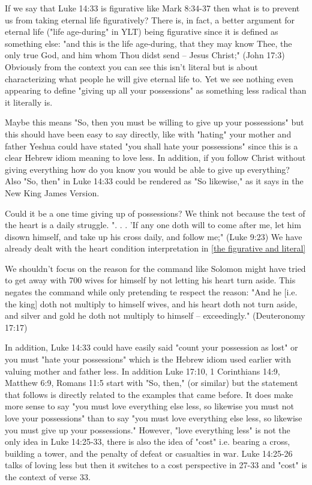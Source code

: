 \documentclass[11pt]{article}
\begin{document}
If we say that Luke 14:33 is figurative like Mark 8:34-37 then what is to prevent us from taking eternal life figuratively? There is, in fact, a better argument for eternal life ("life age-during" in YLT) being figurative since it is defined as something else: 
"and this is the life age-during, that they may know Thee, the only true God, and him whom Thou didst send -- Jesus Christ;" (John 17:3) Obviously from the context you can see this isn't literal but is about characterizing what people he will give eternal life to. Yet we see nothing even appearing to define "giving up all your possessions" as something less radical than it literally is. 

Maybe this means "So, then you must be willing to give up your possessions" but this should have been easy to say directly, like with "hating" your mother and father Yeshua could have stated "you shall hate your possessions" since this is a clear Hebrew idiom meaning to love less. In addition, if you follow Christ without giving everything how do you know you would be able to give up everything? Also "So, then" in Luke 14:33 could be rendered as "So likewise," as it says in the New King James Version.

Could it be a one time giving up of possessions? We think not because the test of the heart is a daily struggle. ". . . 'If any one doth will to come after me, let him disown himself, and take up his cross daily, and follow me;" (Luke 9:23) We have already dealt with the heart condition interpretation in \ref{the figurative and literal} 

We shouldn't focus on the reason for the command like Solomon might have tried to get away with 700 wives for himself by not letting his heart turn aside. This negates the command while only pretending te respect the reason: "And he [i.e. the king] doth not multiply to himself wives, and his heart doth not turn aside, and silver and gold he doth not multiply to himself -- exceedingly." (Deuteronomy 17:17) 

In addition, Luke 14:33 could have easily said "count your possession as lost" or you must "hate your possessions" which is the Hebrew idiom used earlier with valuing mother and father less. In addition Luke 17:10, 1 Corinthians 14:9, Matthew 6:9, Romans 11:5 start with "So, then," (or similar) but the statement that follows is directly related to the examples that came before. It does make more sense to say "you must love everything else less, so likewise you must not love your possessions" than to say "you must love everything else less, so likewise you must give up your possessions." However, "love everything less" is not the only idea in Luke 14:25-33, there is also the idea of "cost" i.e. bearing a cross, building a tower, and the penalty of defeat or casualties in war. Luke 14:25-26 talks of loving less but then it switches to a cost perspective in 27-33 and "cost" is the context of verse 33.
\end{document}
